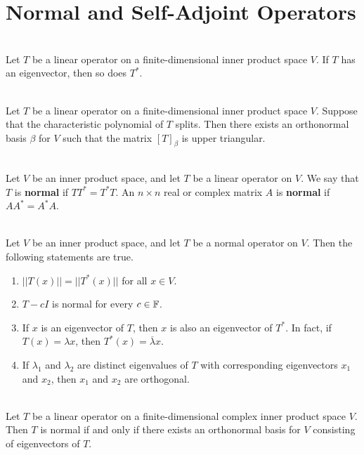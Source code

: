 \section{Normal and Self-Adjoint Operators}

\begin{lemma}
	\hfill\\
	Let $T$ be a linear operator on a finite-dimensional inner product space $V$. If $T$ has an eigenvector, then so does $T^*$.
\end{lemma}

\begin{theorem}
	\hfill\\
	Let $T$ be a linear operator on a finite-dimensional inner product space $V$. Suppose that the characteristic polynomial of $T$ splits. Then there exists an orthonormal basis $\beta$ for $V$ such that the matrix $[T]_\beta$ is upper triangular.
\end{theorem}

\begin{definition}
	\hfill\\
	Let $V$ be an inner product space, and let $T$ be a linear operator on $V$. We say that $T$ is \textbf{normal} if $TT^* = T^*T$. An $n \times n$ real or complex matrix $A$ is \textbf{normal} if $AA^* = A^*A$.
\end{definition}

\begin{theorem}
	\hfill\\
	Let $V$ be an inner product space, and let $T$ be a normal operator on $V$. Then the following statements are true.

	\begin{enumerate}
		\item $||T(x)|| = ||T^*(x)||$ for all $x \in V$.
		\item $T - cI$ is normal for every $c \in \mathbb{F}$.
		\item If $x$ is an eigenvector of $T$, then $x$ is also an eigenvector of $T^*$. In fact, if $T(x) = \lambda x$, then $T^*(x) = \overline{\lambda}x$.
		\item If $\lambda_1$ and $\lambda_2$ are distinct eigenvalues of $T$ with corresponding eigenvectors $x_1$ and $x_2$, then $x_1$ and $x_2$ are orthogonal.
	\end{enumerate}
\end{theorem}

\begin{theorem}
	\hfill\\
	Let $T$ be a linear operator on a finite-dimensional complex inner product space $V$. Then $T$ is normal if and only if there exists an orthonormal basis for $V$ consisting of eigenvectors of $T$.
\end{theorem}

